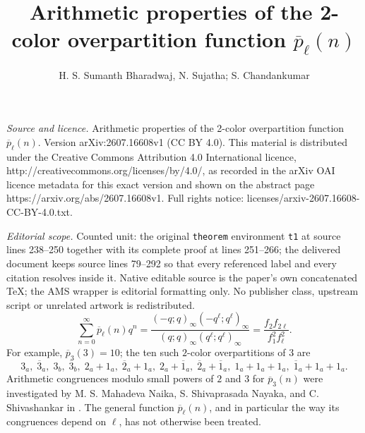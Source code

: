 \documentclass[10pt,a4paper]{amsart}
\numberwithin{equation}{section}
\begin{document}
\title[Arithmetic properties of the 2-color overpartition function ]{Arithmetic properties of the 2-color overpartition function $\overline{p}_\ell(n)$}
\author{H. S. Sumanth Bharadwaj, N. Sujatha; S. Chandankumar}
\date{}
\maketitle
\noindent\emph{Source and licence.} Arithmetic properties of the 2-color overpartition function $\overline{p}_\ell(n)$. Version arXiv:2607.16608v1 (CC BY 4.0). This material is distributed under the Creative Commons Attribution 4.0 International licence, http://creativecommons.org/licenses/by/4.0/, as recorded in the arXiv OAI licence metadata for this exact version and shown on the abstract page https://arxiv.org/abs/2607.16608v1. Full rights notice: licenses/arxiv-2607.16608-CC-BY-4.0.txt.\par\smallskip
\noindent\textit{Editorial scope.} Counted unit: the original \texttt{theorem} environment \texttt{t1} at source lines 238--250 together with its complete proof at lines 251--266; the delivered document keeps source lines 79--292 so that every referenced label and every citation resolves inside it. Native editable source is the paper's own concatenated TeX; the AMS wrapper is editorial formatting only. No publisher class, upstream script or unrelated artwork is redistributed.
	\begin{equation}
		\sum_{n=0}^{\infty} \overline{p}_\ell(n)q^n
		=
		\frac{(-q;q)_\infty(-q^\ell;q^\ell)_\infty}
		{(q;q)_\infty(q^\ell;q^\ell)_\infty}=
		\frac{f_2f_{2\ell}}{f_1^2f_\ell^2}.
		\label{pt}
	\end{equation}
	For example, $\overline{p}_3(3)=10$; the ten such $2$-color overpartitions of $3$ are
	\[
	3_a,\;
	\overline{3}_a,\;
	3_b,\;
	\overline{3}_b,\;
	2_a+1_a,\;
	\overline{2}_a+1_a,\;
	2_a+\overline{1}_a,\;
	\overline{2}_a+\overline{1}_a,\;
	1_a+1_a+1_a,\;
	\overline{1}_a+1_a+1_a.
	\]
	Arithmetic congruences modulo small powers of $2$ and $3$ for $\overline{p}_3(n)$ were investigated by M. S. Mahadeva Naika, S. Shivaprasada Nayaka, and C. Shivashankar in \cite{MSMSSNCS}. The general function $\overline{p}_\ell(n)$, and in particular the way its congruences depend on $\ell$, has not otherwise been treated.
	
\end{document}
